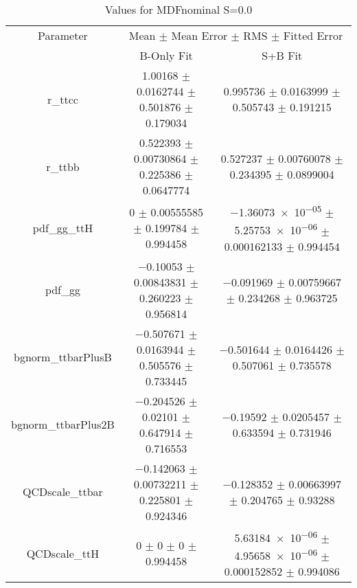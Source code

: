 \begin{table}
\centering
\caption{Values for MDFnominal S=0.0}
\begin{tabular}{ccc}
\toprule
Parameter & \multicolumn{2}{c}{Mean $\pm$ Mean Error $\pm$ RMS $\pm$ Fitted Error}\\
 & B-Only Fit & S+B Fit\\
\midrule
r\_ttcc & \num{1.00168} $\pm$ \num{0.0162744} $\pm$ \num{0.501876} $\pm$ \num{0.179034} & \num{0.995736} $\pm$ \num{0.0163999} $\pm$ \num{0.505743} $\pm$ \num{0.191215}\\
r\_ttbb & \num{0.522393} $\pm$ \num{0.00730864} $\pm$ \num{0.225386} $\pm$ \num{0.0647774} & \num{0.527237} $\pm$ \num{0.00760078} $\pm$ \num{0.234395} $\pm$ \num{0.0899004}\\
pdf\_gg\_ttH & \num{0} $\pm$ \num{0.00555585} $\pm$ \num{0.199784} $\pm$ \num{0.994458} & \num{-1.36073e-05} $\pm$ \num{5.25753e-06} $\pm$ \num{0.000162133} $\pm$ \num{0.994454}\\
pdf\_gg & \num{-0.10053} $\pm$ \num{0.00843831} $\pm$ \num{0.260223} $\pm$ \num{0.956814} & \num{-0.091969} $\pm$ \num{0.00759667} $\pm$ \num{0.234268} $\pm$ \num{0.963725}\\
bgnorm\_ttbarPlusB & \num{-0.507671} $\pm$ \num{0.0163944} $\pm$ \num{0.505576} $\pm$ \num{0.733445} & \num{-0.501644} $\pm$ \num{0.0164426} $\pm$ \num{0.507061} $\pm$ \num{0.735578}\\
bgnorm\_ttbarPlus2B & \num{-0.204526} $\pm$ \num{0.02101} $\pm$ \num{0.647914} $\pm$ \num{0.716553} & \num{-0.19592} $\pm$ \num{0.0205457} $\pm$ \num{0.633594} $\pm$ \num{0.731946}\\
QCDscale\_ttbar & \num{-0.142063} $\pm$ \num{0.00732211} $\pm$ \num{0.225801} $\pm$ \num{0.924346} & \num{-0.128352} $\pm$ \num{0.00663997} $\pm$ \num{0.204765} $\pm$ \num{0.93288}\\
QCDscale\_ttH & \num{0} $\pm$ \num{0} $\pm$ \num{0} $\pm$ \num{0.994458} & \num{5.63184e-06} $\pm$ \num{4.95658e-06} $\pm$ \num{0.000152852} $\pm$ \num{0.994086}\\
\bottomrule
\end{tabular}
\end{table}